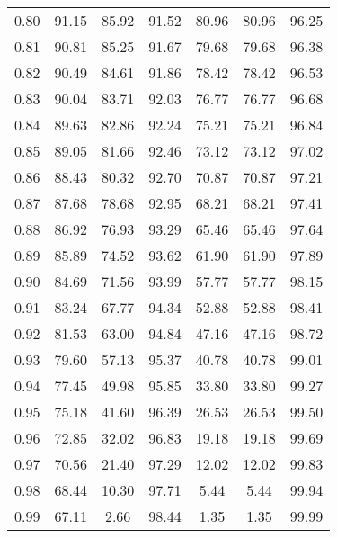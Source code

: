 \begin{tabular}{|c|c|c|c|c|c|c|}
      0.80 &     91.15 &     85.92 &      91.52 &   80.96 &      80.96 &         96.25 \\
      0.81 &     90.81 &     85.25 &      91.67 &   79.68 &      79.68 &         96.38 \\
      0.82 &     90.49 &     84.61 &      91.86 &   78.42 &      78.42 &         96.53 \\
      0.83 &     90.04 &     83.71 &      92.03 &   76.77 &      76.77 &         96.68 \\
      0.84 &     89.63 &     82.86 &      92.24 &   75.21 &      75.21 &         96.84 \\
      0.85 &     89.05 &     81.66 &      92.46 &   73.12 &      73.12 &         97.02 \\
      0.86 &     88.43 &     80.32 &      92.70 &   70.87 &      70.87 &         97.21 \\
      0.87 &     87.68 &     78.68 &      92.95 &   68.21 &      68.21 &         97.41 \\
      0.88 &     86.92 &     76.93 &      93.29 &   65.46 &      65.46 &         97.64 \\
      0.89 &     85.89 &     74.52 &      93.62 &   61.90 &      61.90 &         97.89 \\
      0.90 &     84.69 &     71.56 &      93.99 &   57.77 &      57.77 &         98.15 \\
      0.91 &     83.24 &     67.77 &      94.34 &   52.88 &      52.88 &         98.41 \\
      0.92 &     81.53 &     63.00 &      94.84 &   47.16 &      47.16 &         98.72 \\
      0.93 &     79.60 &     57.13 &      95.37 &   40.78 &      40.78 &         99.01 \\
      0.94 &     77.45 &     49.98 &      95.85 &   33.80 &      33.80 &         99.27 \\
      0.95 &     75.18 &     41.60 &      96.39 &   26.53 &      26.53 &         99.50 \\
      0.96 &     72.85 &     32.02 &      96.83 &   19.18 &      19.18 &         99.69 \\
      0.97 &     70.56 &     21.40 &      97.29 &   12.02 &      12.02 &         99.83 \\
      0.98 &     68.44 &     10.30 &      97.71 &    5.44 &       5.44 &         99.94 \\
      0.99 &     67.11 &      2.66 &      98.44 &    1.35 &       1.35 &         99.99 \\
\bottomrule
\end{tabular}

